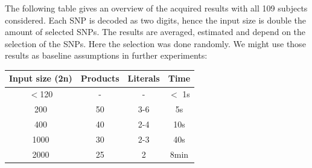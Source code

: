 \documentclass[letterpaper, 11pt]{article}
\begin{document}
The following table gives an overview of the acquired results with all 109 subjects considered. Each SNP is decoded as two digits, hence the input size is double the amount of selected SNPs. The results are averaged, estimated and depend on the selection of the SNPs. Here the selection was done randomly.  We might use those results as baseline assumptions in further experiments:

\begin{center}
\begin{tabular}{ c| c| c| c}
 \textbf{Input size (2n)} & \textbf{Products} & \textbf{Literals} & \textbf{Time} \\ \hline
 $<$120& -&-&$<$ 1s\\
 200 & 50 & 3-6&5s\\  
 400 & 40 & 2-4  & 10s \\
 1000& 30&2-3&40s\\
 2000&25&2&8min
\end{tabular}
\end{center}
\begin{figure}[!ht]
\end{figure}
\end{document}
